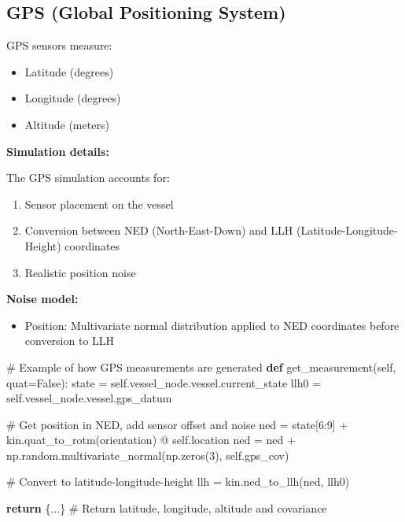 \documentclass[
  letterpaper,
  DIV=11,
  numbers=noendperiod]{scrreprt}
\newenvironment{Shaded}{\begin{snugshade}}{\end{snugshade}}
\newcommand{\CommentTok}[1]{\textcolor[rgb]{0.37,0.37,0.37}{#1}}
\newcommand{\ControlFlowTok}[1]{\textcolor[rgb]{0.00,0.23,0.31}{\textbf{#1}}}
\newcommand{\DecValTok}[1]{\textcolor[rgb]{0.68,0.00,0.00}{#1}}
\newcommand{\KeywordTok}[1]{\textcolor[rgb]{0.00,0.23,0.31}{\textbf{#1}}}
\newcommand{\NormalTok}[1]{\textcolor[rgb]{0.00,0.23,0.31}{#1}}
\newcommand{\OperatorTok}[1]{\textcolor[rgb]{0.37,0.37,0.37}{#1}}
\newcommand{\VariableTok}[1]{\textcolor[rgb]{0.07,0.07,0.07}{#1}}
\providecommand{\tightlist}{%
  \setlength{\itemsep}{0pt}\setlength{\parskip}{0pt}}\usepackage{longtable,booktabs,array}
\begin{document}
\subsection*{GPS (Global Positioning
System)}\label{gps-global-positioning-system}

GPS sensors measure:

\begin{itemize}
\tightlist
\item
  Latitude (degrees)
\item
  Longitude (degrees)
\item
  Altitude (meters)
\end{itemize}

\textbf{Simulation details:}

The GPS simulation accounts for:

\begin{enumerate}
\def\labelenumi{\arabic{enumi}.}
\tightlist
\item
  Sensor placement on the vessel
\item
  Conversion between NED (North-East-Down) and LLH
  (Latitude-Longitude-Height) coordinates
\item
  Realistic position noise
\end{enumerate}

\textbf{Noise model:}

\begin{itemize}
\tightlist
\item
  Position: Multivariate normal distribution applied to NED coordinates
  before conversion to LLH
\end{itemize}

\begin{Shaded}
\begin{Highlighting}[]
\CommentTok{\# Example of how GPS measurements are generated}
\KeywordTok{def}\NormalTok{ get\_measurement(}\VariableTok{self}\NormalTok{, quat}\OperatorTok{=}\VariableTok{False}\NormalTok{):}
\NormalTok{    state }\OperatorTok{=} \VariableTok{self}\NormalTok{.vessel\_node.vessel.current\_state}
\NormalTok{    llh0 }\OperatorTok{=} \VariableTok{self}\NormalTok{.vessel\_node.vessel.gps\_datum}
    
    \CommentTok{\# Get position in NED, add sensor offset and noise}
\NormalTok{    ned }\OperatorTok{=}\NormalTok{ state[}\DecValTok{6}\NormalTok{:}\DecValTok{9}\NormalTok{] }\OperatorTok{+}\NormalTok{ kin.quat\_to\_rotm(orientation) }\OperatorTok{@} \VariableTok{self}\NormalTok{.location}
\NormalTok{    ned }\OperatorTok{=}\NormalTok{ ned }\OperatorTok{+}\NormalTok{ np.random.multivariate\_normal(np.zeros(}\DecValTok{3}\NormalTok{), }\VariableTok{self}\NormalTok{.gps\_cov)}
    
    \CommentTok{\# Convert to latitude{-}longitude{-}height}
\NormalTok{    llh }\OperatorTok{=}\NormalTok{ kin.ned\_to\_llh(ned, llh0)}

    \ControlFlowTok{return}\NormalTok{ \{...\}  }\CommentTok{\# Return latitude, longitude, altitude and covariance}
\end{Highlighting}
\end{Shaded}
\end{document}
